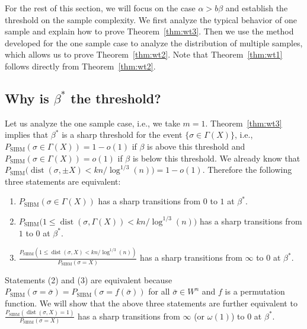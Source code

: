 \documentclass[conference]{IEEEtran}
\DeclareMathOperator{\SIBM}{SIBM}
\DeclareMathOperator{\dist}{dist}
\begin{document}
For the rest of this section, we will focus on the case $\alpha>b\beta$ and establish the threshold on the sample complexity. We first analyze the typical behavior of one sample and explain how to prove Theorem~\ref{thm:wt3}. Then we use the method developed for the one sample case to analyze the distribution of multiple samples, which allows us to prove Theorem~\ref{thm:wt2}. Note that Theorem~\ref{thm:wt1} follows directly from Theorem~\ref{thm:wt2}.

\subsection{Why is $\beta^\ast$ the threshold?} \label{sect:why}

Let us analyze the one sample case, i.e., we take $m=1$.
Theorem~\ref{thm:wt3} implies that $\beta^\ast$ is a sharp threshold for the event $\{\sigma \in \Gamma(X)\}$, i.e., $P_{\SIBM}(\sigma\in \Gamma(X))=1-o(1)$
if $\beta$ is above this threshold and $P_{\SIBM}(\sigma\in \Gamma(X))=o(1)$ if $\beta$ is below this threshold.
We already know that
$
P_{\SIBM} \big(\dist(\sigma,\pm X)< kn/\log^{1/3}(n) \big) = 1- o(1) .
$
Therefore the following three statements are equivalent:
\begin{enumerate}
\item $P_{\SIBM}(\sigma\in \Gamma(X))$ has a sharp transitions from $0$ to $1$ at $\beta^\ast$.
\item $P_{\SIBM} \big( 1\le \dist(\sigma,\Gamma(X))< kn/\log^{1/3}(n) \big)$ has a sharp transitions from $1$ to $0$ at $\beta^\ast$.
\item $\frac{P_{\SIBM} ( 1\le \dist(\sigma, X)< kn/\log^{1/3}(n) )}{P_{\SIBM}(\sigma= X)}$ has a sharp transitions from $\infty$ to $0$ at $\beta^\ast$.
\end{enumerate}
Statements (2) and (3) are equivalent because $P_{\SIBM}(\sigma=\bar{\sigma})=P_{\SIBM}(\sigma=f(\bar{\sigma}))$ for all $\bar{\sigma}\in W^n$ and $f$ is a permutation function.
We will show that the above three statements are further equivalent to
  $\frac{P_{\SIBM} ( \dist(\sigma, X) = 1 )}{P_{\SIBM}(\sigma= X)}$ has a sharp transitions from $\infty$ (or $\omega(1)$) to $0$ at $\beta^\ast$.
\end{document}
